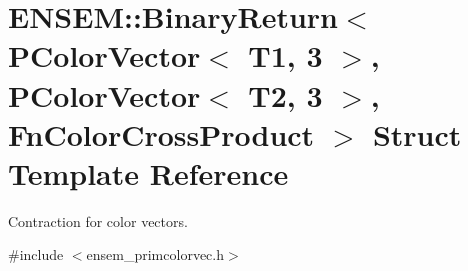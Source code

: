 \hypertarget{structENSEM_1_1BinaryReturn_3_01PColorVector_3_01T1_00_013_01_4_00_01PColorVector_3_01T2_00_013_ba40478e41b9dc719d7fd5b6b54bac05}{}\section{E\+N\+S\+EM\+:\+:Binary\+Return$<$ P\+Color\+Vector$<$ T1, 3 $>$, P\+Color\+Vector$<$ T2, 3 $>$, Fn\+Color\+Cross\+Product $>$ Struct Template Reference}
\label{structENSEM_1_1BinaryReturn_3_01PColorVector_3_01T1_00_013_01_4_00_01PColorVector_3_01T2_00_013_ba40478e41b9dc719d7fd5b6b54bac05}


Contraction for color vectors.  




{\ttfamily \#include $<$ensem\+\_\+primcolorvec.\+h$>$}

